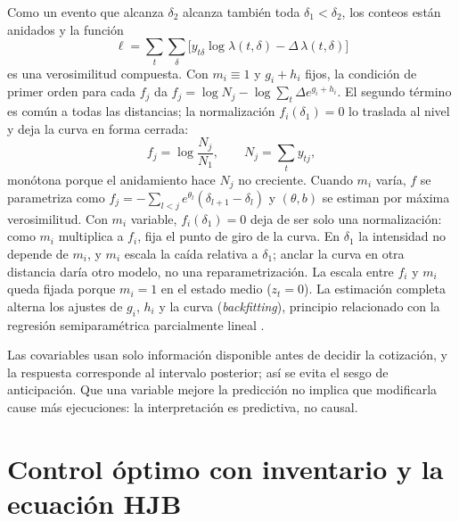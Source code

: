 Como un evento que alcanza $\delta_2$ alcanza también toda $\delta_1<\delta_2$, los conteos están anidados y la función
\begin{equation}
 \ell=\sum_t\sum_\delta\bigl[y_{t\delta}\log\lambda(t,\delta)-\Delta\,\lambda(t,\delta)\bigr]
 \label{eq:ll-compuesta}
\end{equation}
es una verosimilitud compuesta. Con $m_i\equiv1$ y $g_i+h_i$ fijos, la condición de primer orden para cada $f_j$ da $f_j=\log N_j-\log\sum_t\Delta e^{g_i+h_i}$. El segundo término es común a todas las distancias; la normalización $f_i(\delta_1)=0$ lo traslada al nivel y deja la curva en forma cerrada:
\begin{equation}
 f_j=\log\frac{N_j}{N_1},\qquad N_j=\sum_t y_{tj},
 \label{eq:f-cerrada}
\end{equation}
monótona porque el anidamiento hace $N_j$ no creciente. Cuando $m_i$ varía, $f$ se parametriza como $f_j=-\sum_{l<j}e^{\theta_l}(\delta_{l+1}-\delta_l)$ y $(\theta,b)$ se estiman por máxima verosimilitud. Con $m_i$ variable, $f_i(\delta_1)=0$ deja de ser solo una normalización: como $m_i$ multiplica a $f_i$, fija el punto de giro de la curva. En $\delta_1$ la intensidad no depende de $m_i$, y $m_i$ escala la caída relativa a $\delta_1$; anclar la curva en otra distancia daría otro modelo, no una reparametrización. La escala entre $f_i$ y $m_i$ queda fijada porque $m_i=1$ en el estado medio ($z_t=0$). La estimación completa alterna los ajustes de $g_i$, $h_i$ y la curva (\textit{backfitting}), principio relacionado con la regresión semiparamétrica parcialmente lineal \citep{RobinsonSemiparametric1988,SancettaLOB2024}.

Las covariables usan solo información disponible antes de decidir la cotización, y la respuesta corresponde al intervalo posterior; así se evita el sesgo de anticipación. Que una variable mejore la predicción no implica que modificarla cause más ejecuciones: la interpretación es predictiva, no causal.

\section{Control óptimo con inventario y la ecuación HJB}
\label{sec:hjb-teoria}


